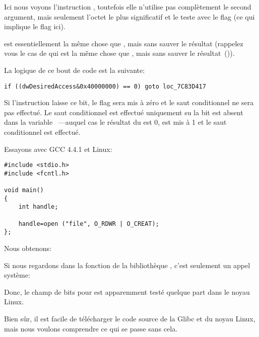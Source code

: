 Ici nous voyons l'instruction \TEST, toutefois elle n'utilise pas complètement le
second argument, mais seulement l'octet le plus significatif et le teste avec le
flag  (ce qui implique le flag  ici).

\TEST est essentiellement la même chose que \AND, mais sans sauver le résultat
(rappelez vous le cas de \CMP qui est la même chose que \SUB, mais sans sauver le
résultat~()).

La logique de ce bout de code est la suivante:

\begin{lstlisting}[style=customc]
if ((dwDesiredAccess&0x40000000) == 0) goto loc_7C83D417
\end{lstlisting}


Si l'instruction \AND laisse ce bit, le flag \ZF sera mis à zéro et le saut conditionnel
\JZ ne sera pas effectué.
Le saut conditionnel est effectué uniquement su la bit  est absent
dans la variable ~---auquel cas le résultat du \AND est 0, \ZF
est mis à 1 et le saut conditionnel est effectué.

Essayons avec GCC 4.4.1 et Linux:

\begin{lstlisting}[style=customc]
#include <stdio.h>
#include <fcntl.h>

void main()
{
	int handle;

	handle=open ("file", O_RDWR | O_CREAT);
};
\end{lstlisting}

Nous obtenons:




Si nous regardons dans la fonction  de la bibliothèque ,
c'est seulement un appel système:



Donc, le champ de bits pour  est apparemment testé quelque part dans le
noyau Linux.

Bien sûr, il est facile de télécharger le code source de la Glibc et du noyau Linux,
mais nous voulons comprendre ce qui se passe sans cela.

